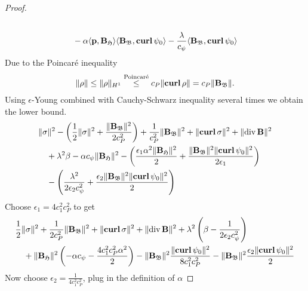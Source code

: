 \documentclass[../master_thesis.tex]{subfiles}
\begin{document}
\begin{proof}
\begin{align*}
        \\ &\quad- \alpha \langle \mathbf{p}, \mathbf{B}_\mathfrak{H} \rangle \langle \mathbf{B}_\mathfrak{B}, \veccurl \psi_0 \rangle
            - \frac{\lambda}{c_\psi} \langle \mathbf{B}_\mathfrak{B} , \veccurl \psi_0 \rangle
    \end{align*}
    Due to the Poincaré inequality
    \begin{align*}
        \lVert \rho \rVert \leq \lVert \rho \rVert _{H^1} 
        \stackrel{\text{Poincaré}}{\leq} c_P \lVert \veccurl \rho \rVert 
        = c_P \lVert \mathbf{B}_\mathfrak{B} \rVert.
    \end{align*}
    Using $\epsilon$-Young combined with Cauchy-Schwarz inequality several times 
    we obtain the lower bound.
    \begin{align*}        
        &\lVert \sigma \rVert^2 - 
            \left( \frac{1}{2} \lVert \sigma \rVert^2 
            + \frac{\lVert \mathbf{B}_\mathfrak{B} \rVert^2}{2 c_P^2}  \right)
            + \frac{1}{c_P^2} \lVert \mathbf{B}_\mathfrak{B} \rVert^2
            + \lVert  \veccurl \sigma \rVert^2 + \lVert \diver \mathbf{B} \rVert ^2
        \\ &\quad+ \lambda ^2 \beta - \alpha c_\psi \lVert \mathbf{B}_\mathfrak{H} \rVert^2
            - \left( \frac{\epsilon_1 \alpha^2 \lVert \mathbf{B}_\mathfrak{H} \rVert^2}{2} 
            + \frac{\lVert \mathbf{B}_\mathfrak{B} \rVert^2 \lVert  \veccurl \psi_0 \rVert^2}{2 \epsilon_1} \right)
        \\ &\quad - \left( \frac{\lambda^2}{2 \epsilon_2 c_\psi^2} 
            + \frac{\epsilon_2 \lVert \mathbf{B}_\mathfrak{B} \rVert^2 \lVert  \veccurl \psi_0 \rVert^2}{2} \right)
    \end{align*}
    Choose $\epsilon_1 = 4 c_1^2 c_P^2$ to get 
    \begin{align*}
        &\frac{1}{2} \lVert \sigma \rVert^2 + \frac{1}{2 c_P^2} \lVert \mathbf{B}_\mathfrak{B} \rVert^2
        + \lVert  \veccurl \sigma \rVert^2 + \lVert \diver \mathbf{B} \rVert ^2
        + \lambda ^2 \left( \beta - \frac{1}{2 \epsilon_2 c_\psi^2} \right) 
        \\ &\quad+ \lVert \mathbf{B}_\mathfrak{H} \rVert^2 
        \left( - \alpha c_\psi - \frac{4 c_1^2 c_P^2 \alpha^2}{2} \right)
        - \lVert \mathbf{B}_\mathfrak{B} \rVert^2 \frac{\lVert  \veccurl \psi_0 \rVert^2}{8c_1^2 c_P^2}
        - \lVert \mathbf{B}_\mathfrak{B} \rVert^2 \frac{ \epsilon_2 \lVert  \veccurl \psi_0 \rVert^2 }{2}
    \end{align*}
    Now choose $\epsilon_2 = \frac{1}{4 c_1^2 c_P^2}$, plug in the definition of $\alpha$

\end{proof}
\end{document}
